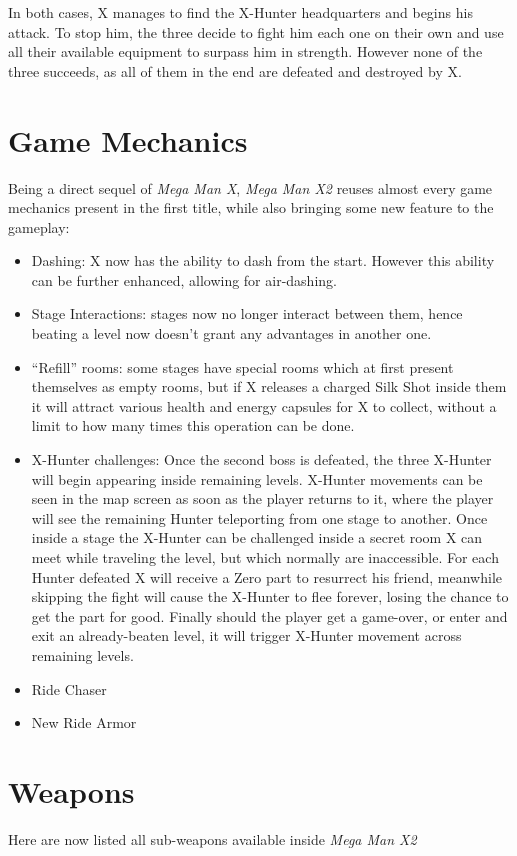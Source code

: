 In both cases, X manages to find the X-Hunter headquarters and begins his attack. To stop him, the three decide to fight him each one on their own and use all their available equipment to surpass him in strength. However none of the three succeeds, as all of them in the end are defeated and destroyed by X.


\section{Game Mechanics}
Being a direct sequel of \textit{Mega Man X}, \textit{Mega Man X2} reuses almost every game mechanics present in the first title, while also bringing some new feature to the gameplay:
\begin{itemize}
	\item Dashing: X now has the ability to dash from the start. However this ability can be further enhanced, allowing for air-dashing.
	\item Stage Interactions: stages now no longer interact between them, hence beating a level now doesn't grant any advantages in another one.
	\item ``Refill'' rooms: some stages have special rooms which at first present themselves as empty rooms, but if X releases a charged Silk Shot inside them it will attract various health and energy capsules for X to collect, without a limit to how many times this operation can be done.
	\item X-Hunter challenges: Once the second boss is defeated, the three X-Hunter will begin appearing inside remaining levels. X-Hunter movements can be seen in the map screen as soon as the player returns to it, where the player will see the remaining Hunter teleporting from one stage to another. Once inside a stage the X-Hunter can be challenged inside a secret room X can meet while traveling the level, but which normally are inaccessible. For each Hunter defeated X will receive a Zero part to resurrect his friend, meanwhile skipping the fight will cause the X-Hunter to flee forever, losing the chance to get the part for good. Finally should the player get a game-over, or enter and exit an already-beaten level, it will trigger X-Hunter movement across remaining levels.
	\item Ride Chaser %
	\item New Ride Armor
\end{itemize}

\section{Weapons}\label{X2:sub_weapon}
Here are now listed all sub-weapons available inside \textit{Mega Man X2}~\cite{wiki:X_weapons}

